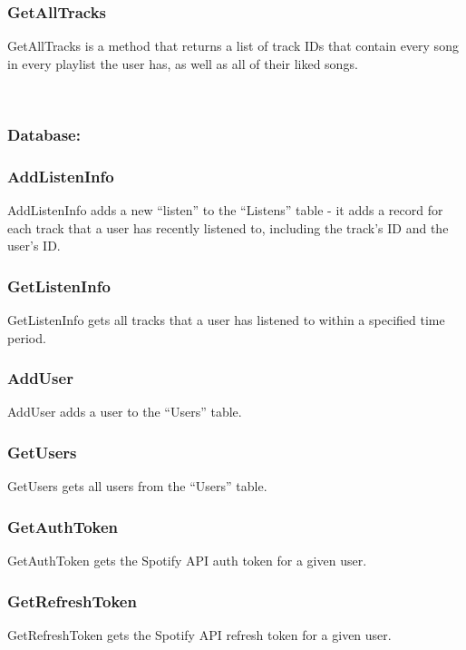 \documentclass[10pt, notitlepage]{report}
\begin{document}
\subsubsection{GetAllTracks}
GetAllTracks is a method that returns a list of track IDs that contain every song in every playlist the user has, as well as all of their liked songs.

\leavevmode \\

\subsubsection{Database:}

\hrulefill

\subsubsection{AddListenInfo}
AddListenInfo adds a new “listen” to the “Listens” table - it adds a record for each track that a user has recently listened to, including the track’s ID and the user’s ID.

\subsubsection{GetListenInfo}
GetListenInfo gets all tracks that a user has listened to within a specified time period.

\subsubsection{AddUser}
AddUser adds a user to the “Users” table.

\subsubsection{GetUsers}
GetUsers gets all users from the “Users” table.

\subsubsection{GetAuthToken}
GetAuthToken gets the Spotify API auth token for a given user.

\subsubsection{GetRefreshToken}
GetRefreshToken gets the Spotify API refresh token for a given user.
\end{document}
